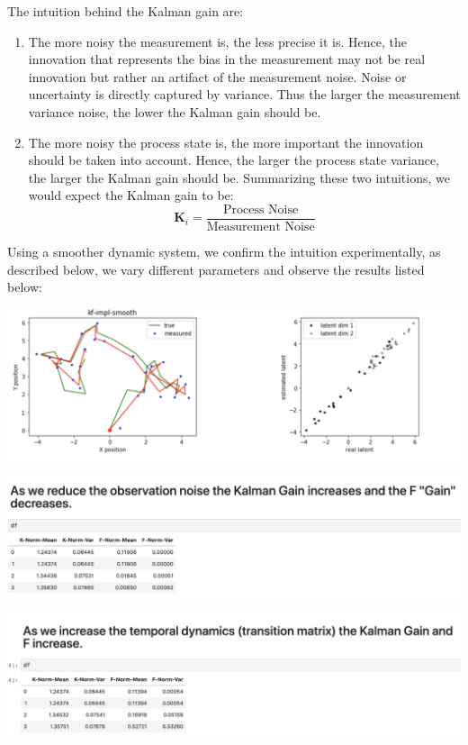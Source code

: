 \documentclass[12pt]{article}
\newcommand{\matr}[1]{\bm{#1}}     %
\begin{document}
The intuition behind the Kalman gain are:
\begin{enumerate}
	\item The more noisy the measurement is, the less precise it is. Hence, the innovation that represents the bias in the measurement may not be real innovation but rather an artifact of the measurement noise. Noise or uncertainty is directly captured by variance. Thus the larger the measurement variance noise, the lower the Kalman gain should be.
	\item The more noisy the process state is, the more important the innovation should be taken into account. Hence, the larger the process state variance, the larger the Kalman gain should be.
Summarizing these two intuitions, we would expect the Kalman gain to be:
\[
	\matr{K}_i = \frac{ \text{Process Noise}}{ \text{Measurement Noise}}
\]
\end{enumerate}
Using a smoother dynamic system, we confirm the intuition experimentally, as described below, we vary different parameters and observe the results listed below:
\begin{center}
	\includegraphics[width=1\linewidth]{figures/problem_4_4.png} 
\end{center}
\begin{center}
	\includegraphics[width=1\linewidth]{figures/problem_4_5.png} 
\end{center}
\begin{center}
	\includegraphics[width=1\linewidth]{figures/problem_4_6.png} 
\end{center}
\end{document}
